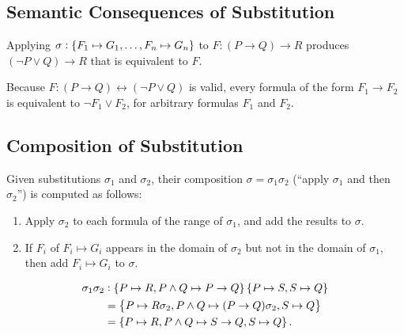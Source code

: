 \subsection{Semantic Consequences of Substitution}

\begin{example}
	Applying $\sigma:\set{F_1\mapsto G_1,\dots,F_n\mapsto G_n}$ to $F:(P\to Q)\to R$ produces $(\lnot P\lor Q)\to R$ that is equivalent to $F$.
\end{example}

\begin{example}
	Because $F:(P\to Q)\leftrightarrow(\lnot P\lor Q)$ is valid, every formula of the form $F_1\to F_2$ is equivalent to $\lnot F_1\lor F_2$, for arbitrary formulas $F_1$ and $F_2$.
\end{example}

\subsection{Composition of Substitution}
Given substitutions $\sigma_1$ and $\sigma_2$, their composition $\sigma=\sigma_1\sigma_2$ (``apply $\sigma_1$ and then $\sigma_2$'') is computed as follows:
\begin{enumerate}
	\item Apply $\sigma_2$ to each formula of the range of $\sigma_1$, and add the results to $\sigma$.
	\item If $F_i$ of $F_i\mapsto G_i$ appears in the domain of $\sigma_2$ but not in the domain of $\sigma_1$, then add $F_i\mapsto G_i$ to $\sigma$.
\end{enumerate}
\begin{example}
\begin{align*}
	\sigma_1\sigma_2&:\set{P\mapsto R,P\land Q\mapsto P\to Q}\set{P\mapsto S,S\mapsto Q}\\
	&=\set{P\mapsto R\sigma_2,P\land Q\mapsto (P\to Q)\sigma_2, S\mapsto Q} \\
	&= \set{P\mapsto R, P\land Q\mapsto S\to Q, S\mapsto Q}.
\end{align*}
\end{example}

